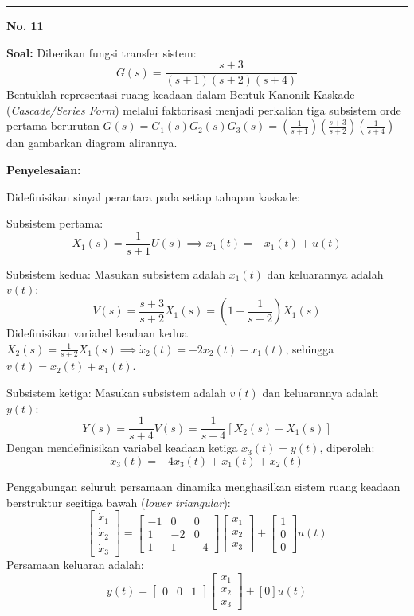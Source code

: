 \documentclass[11pt,a4paper]{article}
\begin{document}
\vspace{12pt}
\hrule
\vspace{10pt}

\textbf{\large No. 11}

\textbf{Soal:}  
Diberikan fungsi transfer sistem:
$$G(s) = \frac{s + 3}{(s + 1)(s + 2)(s + 4)}$$
Bentuklah representasi ruang keadaan dalam Bentuk Kanonik Kaskade (\textit{Cascade/Series Form}) melalui faktorisasi menjadi perkalian tiga subsistem orde pertama berurutan $G(s) = G_1(s) G_2(s) G_3(s) = \left(\frac{1}{s+1}\right)\left(\frac{s+3}{s+2}\right)\left(\frac{1}{s+4}\right)$ dan gambarkan diagram alirannya.

\textbf{Penyelesaian:}

Didefinisikan sinyal perantara pada setiap tahapan kaskade:

Subsistem pertama:
$$X_1(s) = \frac{1}{s+1} U(s) \implies \dot{x}_1(t) = -x_1(t) + u(t)$$

Subsistem kedua: Masukan subsistem adalah $x_1(t)$ dan keluarannya adalah $v(t)$:
$$V(s) = \frac{s+3}{s+2} X_1(s) = \left( 1 + \frac{1}{s+2} \right) X_1(s)$$
Didefinisikan variabel keadaan kedua $X_2(s) = \frac{1}{s+2} X_1(s) \implies \dot{x}_2(t) = -2 x_2(t) + x_1(t)$, sehingga $v(t) = x_2(t) + x_1(t)$.

Subsistem ketiga: Masukan subsistem adalah $v(t)$ dan keluarannya adalah $y(t)$:
$$Y(s) = \frac{1}{s+4} V(s) = \frac{1}{s+4} [X_2(s) + X_1(s)]$$
Dengan mendefinisikan variabel keadaan ketiga $x_3(t) = y(t)$, diperoleh:
$$\dot{x}_3(t) = -4 x_3(t) + x_1(t) + x_2(t)$$

Penggabungan seluruh persamaan dinamika menghasilkan sistem ruang keadaan berstruktur segitiga bawah (\textit{lower triangular}):
$$\begin{bmatrix} \dot{x}_1 \\ \dot{x}_2 \\ \dot{x}_3 \end{bmatrix} = \begin{bmatrix} -1 & 0 & 0 \\ 1 & -2 & 0 \\ 1 & 1 & -4 \end{bmatrix} \begin{bmatrix} x_1 \\ x_2 \\ x_3 \end{bmatrix} + \begin{bmatrix} 1 \\ 0 \\ 0 \end{bmatrix} u(t)$$
Persamaan keluaran adalah:
$$y(t) = \begin{bmatrix} 0 & 0 & 1 \end{bmatrix} \begin{bmatrix} x_1 \\ x_2 \\ x_3 \end{bmatrix} + [0] u(t)$$
\end{document}
